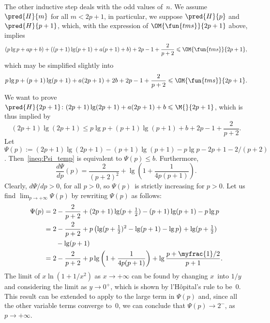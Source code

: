 The other inductive step deals with the odd values of~\(n\). We assume
\(\pred{H}{m}\) for all \(m < 2p+1\), in particular, we suppose
\(\pred{H}{p}\) and \(\pred{H}{p+1}\), which, with the expression of
\(\OM{\fun{tms}}{2p+1}\) above, implies
\begin{equation*}
(p\lg p + ap + b) + ((p+1)\lg(p+1) + a(p+1) + b) + 2p - 1 +
\frac{2}{p+2} \leqslant \OM{\fun{tms}}{2p+1},
\end{equation*}
which may be simplified slightly into
\begin{equation*}
p\lg p + (p+1)\lg(p+1) + a(2p+1) + 2b + 2p - 1 + \frac{2}{p+2}
\leqslant \OM{\fun{tms}}{2p+1}.
\end{equation*}
We want to prove \(\pred{H}{2p+1} \colon (2p+1)\lg(2p+1) +
a(2p+1) + b \leqslant \M{}{2p+1}\), which is thus implied by
\begin{equation}
  (2p+1)\lg(2p+1) \leqslant
  p\lg p + (p+1)\lg(p+1) + b + 2p - 1 + \frac{2}{p+2}.
\label{ineq:Psi_temp}
\end{equation}
Let \(\Psi(p) := (2p+1)\lg(2p+1) - (p+1)\lg(p+1) - p\lg p -
2p + 1 - 2/(p+2)\). Then~\eqref{ineq:Psi_temp} is equivalent to
\(\Psi(p) \leqslant b\). Furthermore,
\begin{equation*}
\frac{d\Psi}{dp}(p) = \frac{2}{(p+2)^2} + \lg\left(1+\frac{1}{4p(p+1)}\right).
\end{equation*}
Clearly, \(d\Psi/dp > 0\), for all \(p > 0\), so \(\Psi(p)\)~is
strictly increasing for \(p > 0\). Let us find \(\lim_{p \to
  +\infty}\Psi(p)\) by rewriting \(\Psi(p)\) as follows:
\begin{align*}
\Psi(p)
  &= 2 - \frac{2}{p+2} + (2p+1)\lg(p+\tfrac{1}{2}) - (p+1)\lg(p+1)
     - p\lg p\\
  &= 2 - \frac{2}{p+2} + p\left(\lg(p+\tfrac{1}{2})^2 - \lg(p+1)
   - \lg p\right) + \lg(p+\tfrac{1}{2})\\
  &\phantom{=} \quad - \lg(p+1)\\
  &= 2 - \frac{2}{p+2} + p\lg\left(1 + \frac{1}{4p(p+1)}\right) +
  \lg\frac{p + \myfrac{1}/{2}}{p+1}.
\end{align*}
The limit of \(x\ln(1+1/x^2)\) as \(x \to +\infty\) can be found by
changing \(x\)~into \(1/y\) and considering the limit as \(y \to
0^{+}\), which is shown by l'H\^{o}pital's rule to be~\(0\). This
result can be extended to apply to the large term in \(\Psi(p)\) and,
since all the other variable terms converge to~\(0\), we can conclude
that \(\Psi(p) \to 2^{-}\), as \(p \to +\infty\).

